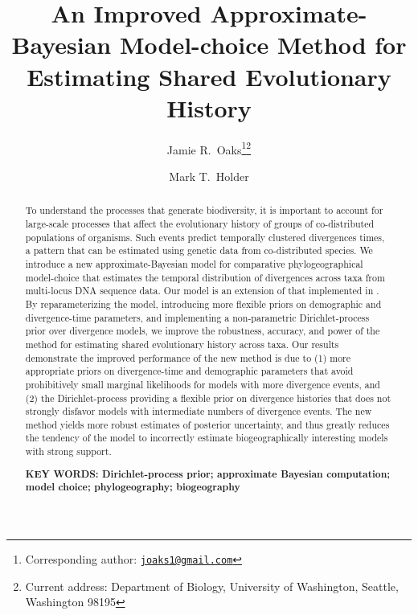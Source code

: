 \documentclass[letterpaper,12pt]{article}
\title{An Improved Approximate-Bayesian Model-choice Method for Estimating
Shared Evolutionary History}
\author[1]{Jamie R.\ Oaks\thanks{Corresponding author: \href{mailto:joaks1@gmail.com}{\tt joaks1@gmail.com}}\thanks{Current address: Department of Biology, University of Washington, Seattle, Washington 98195}}
\author[1]{Mark T.\ Holder}
\affil[1]{Department of Ecology and Evolutionary Biology, University of Kansas, Lawrence, Kansas 66045}
\date{\parbox{\linewidth}{\centering%
    \today\endgraf\bigskip
    \textbf{Running head}: Improved Estimation of Shared Evolutionary History}}
\begin{document}

\maketitle

\begin{abstract}
    To understand the processes that generate biodiversity, it is
    important to account for large-scale processes that affect the evolutionary
    history of groups of co-distributed populations of organisms.
    Such events predict temporally clustered divergences times, a pattern
    that can be estimated using genetic data from co-distributed species.
    We introduce a new approximate-Bayesian model for comparative
    phylogeographical model-choice that estimates the temporal distribution of
    divergences across taxa from multi-locus DNA sequence data.
    Our model is an extension of that implemented in \msb.
    By reparameterizing the model, introducing more flexible priors on
    demographic and divergence-time parameters, and implementing a
    non-parametric Dirichlet-process prior over divergence models, we improve
    the robustness, accuracy, and power of the method for estimating shared
    evolutionary history across taxa.
    Our results demonstrate the improved performance of the new method is due
    to (1) more appropriate priors on divergence-time and demographic
    parameters that avoid prohibitively small marginal likelihoods for models
    with more divergence events,
    and (2) the Dirichlet-process providing a flexible prior on divergence
    histories that does not strongly disfavor models with intermediate numbers
    of divergence events.
    The new method yields more robust estimates of posterior uncertainty, and
    thus greatly reduces the tendency of the model to incorrectly estimate
    biogeographically interesting models with strong support.

    \vspace{12pt}
    \noindent\textbf{KEY WORDS: Dirichlet-process prior; approximate Bayesian
    computation; model choice; phylogeography; biogeography} 
\end{abstract}
\end{document}
